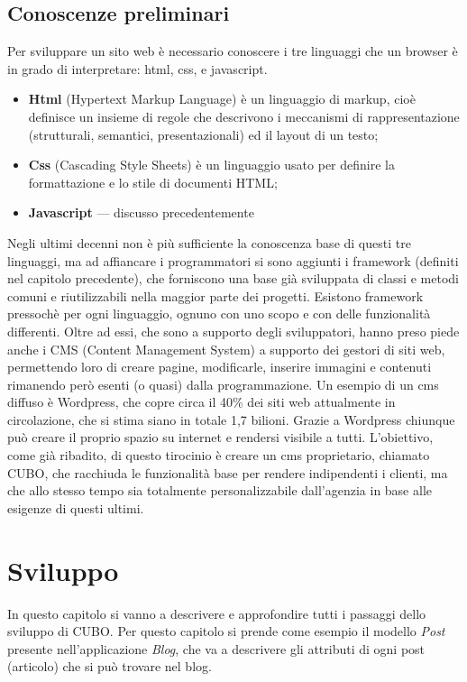 \documentclass[12pt,a4paper]{article}
\begin{document}
\subsection{Conoscenze preliminari}
Per sviluppare un sito web è necessario conoscere i tre linguaggi che un browser è in grado di interpretare: html, css, e javascript.
\begin{itemize}
    \item \textbf{Html} (Hypertext Markup Language) è un linguaggio di markup, cioè definisce un insieme di regole che descrivono i meccanismi di rappresentazione (strutturali, semantici, presentazionali) ed il layout di un testo;
    \item \textbf{Css} (Cascading Style Sheets) è un linguaggio usato per definire la formattazione e lo stile di documenti HTML;
    \item \textbf{Javascript} --- discusso precedentemente
\end{itemize}

Negli ultimi decenni non è più sufficiente la conoscenza base di questi tre linguaggi, ma ad affiancare i programmatori si sono aggiunti i framework (definiti nel capitolo precedente), che forniscono una base già sviluppata di classi e metodi comuni e riutilizzabili nella maggior parte dei progetti. Esistono framework pressochè per ogni linguaggio, ognuno con uno scopo e con delle funzionalità differenti.
Oltre ad essi, che sono a supporto degli sviluppatori, hanno preso piede anche i CMS (Content Management System) a supporto dei	gestori di siti web, permettendo loro di creare pagine, modificarle, inserire immagini e contenuti rimanendo però esenti (o quasi) dalla programmazione.
Un esempio di un cms diffuso è Wordpress, che copre circa il 40\% dei siti web attualmente in circolazione, che si stima siano in totale 1,7 bilioni.
Grazie a Wordpress chiunque può creare il proprio spazio su internet e rendersi visibile a tutti.
L’obiettivo, come già ribadito, di questo tirocinio è creare un cms proprietario, chiamato CUBO, che racchiuda le funzionalità base per rendere indipendenti i clienti, ma che allo stesso tempo sia totalmente personalizzabile dall’agenzia in base alle esigenze di questi ultimi.
\clearpage
\section{Sviluppo}
In questo capitolo si vanno a descrivere e approfondire tutti i passaggi dello sviluppo di CUBO.
Per questo capitolo si prende come esempio il modello \textit{Post} presente nell’applicazione \textit{Blog}, che va a descrivere gli attributi di ogni post (articolo) che si può trovare nel blog.
\end{document}
